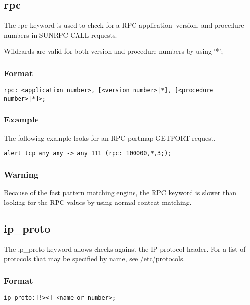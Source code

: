 \documentclass[english]{report}
\begin{document}
\subsection{rpc}

The rpc keyword is used to check for a RPC application, version, and procedure numbers in SUNRPC CALL requests.

Wildcards are valid for both version and procedure numbers by using '*';

\subsubsection{Format}

\begin{verbatim}
rpc: <application number>, [<version number>|*], [<procedure number>|*]>;
\end{verbatim}

\subsubsection{Example}

The following example looks for an RPC portmap GETPORT request.

\begin{verbatim}
alert tcp any any -> any 111 (rpc: 100000,*,3;);
\end{verbatim}

\subsubsection{Warning}

Because of the fast pattern matching engine, the RPC keyword is slower than looking for the RPC values by using normal content matching.

\subsection{ip\_proto}

The ip\_proto keyword allows checks against the IP protocol header.  For a list
of protocols that may be specified by name, see /etc/protocols. 

\subsubsection{Format}

\begin{verbatim}
ip_proto:[!><] <name or number>;
\end{verbatim}
\end{document}
